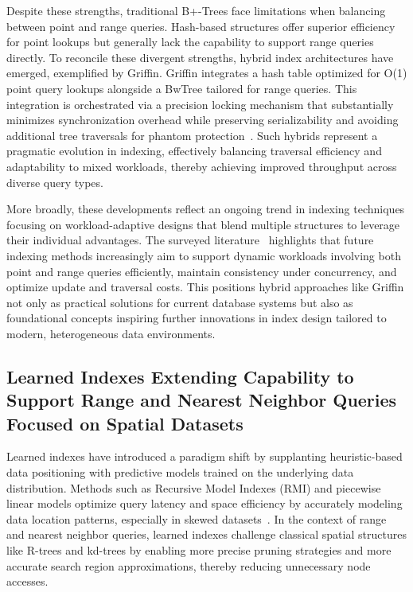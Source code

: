 \documentclass[sigconf]{acmart}
\begin{document}
Despite these strengths, traditional B+-Trees face limitations when balancing between point and range queries. Hash-based structures offer superior efficiency for point lookups but generally lack the capability to support range queries directly. To reconcile these divergent strengths, hybrid index architectures have emerged, exemplified by Griffin. Griffin integrates a hash table optimized for O(1) point query lookups alongside a BwTree tailored for range queries. This integration is orchestrated via a precision locking mechanism that substantially minimizes synchronization overhead while preserving serializability and avoiding additional tree traversals for phantom protection~\cite{ref31}. Such hybrids represent a pragmatic evolution in indexing, effectively balancing traversal efficiency and adaptability to mixed workloads, thereby achieving improved throughput across diverse query types.

More broadly, these developments reflect an ongoing trend in indexing techniques focusing on workload-adaptive designs that blend multiple structures to leverage their individual advantages. The surveyed literature~\cite{ref31} highlights that future indexing methods increasingly aim to support dynamic workloads involving both point and range queries efficiently, maintain consistency under concurrency, and optimize update and traversal costs. This positions hybrid approaches like Griffin not only as practical solutions for current database systems but also as foundational concepts inspiring further innovations in index design tailored to modern, heterogeneous data environments.

\subsection{Learned Indexes Extending Capability to Support Range and Nearest Neighbor Queries Focused on Spatial Datasets}

Learned indexes have introduced a paradigm shift by supplanting heuristic-based data positioning with predictive models trained on the underlying data distribution. Methods such as Recursive Model Indexes (RMI) and piecewise linear models optimize query latency and space efficiency by accurately modeling data location patterns, especially in skewed datasets~\cite{ref34}. In the context of range and nearest neighbor queries, learned indexes challenge classical spatial structures like R-trees and kd-trees by enabling more precise pruning strategies and more accurate search region approximations, thereby reducing unnecessary node accesses.
\end{document}
